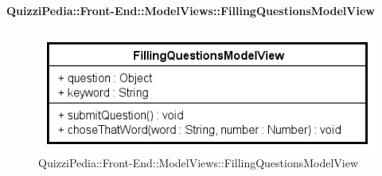\paragraph{QuizziPedia::Front-End::ModelViews::FillingQuestionsModelView}
\begin{figure} [ht]
	\centering
	\includegraphics[scale=0.80]{UML/Classi/Front-End/QuizziPedia_Front-end_ModelView_FillingQuestionsModelView.png}
	\caption{QuizziPedia::Front-End::ModelViews::FillingQuestionsModelView}
\end{figure} \FloatBarrier
